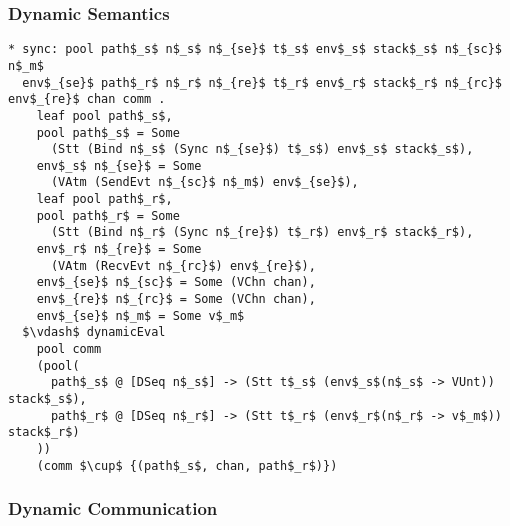 \documentclass{beamer}
\begin{document}
\begin{frame}[fragile]
	\frametitle{Dynamic Semantics}
\begin{lstlisting}[language=logic, mathescape]
* sync: pool path$_s$ n$_s$ n$_{se}$ t$_s$ env$_s$ stack$_s$ n$_{sc}$ n$_m$
  env$_{se}$ path$_r$ n$_r$ n$_{re}$ t$_r$ env$_r$ stack$_r$ n$_{rc}$ env$_{re}$ chan comm .
    leaf pool path$_s$,
    pool path$_s$ = Some
      (Stt (Bind n$_s$ (Sync n$_{se}$) t$_s$) env$_s$ stack$_s$),
    env$_s$ n$_{se}$ = Some
      (VAtm (SendEvt n$_{sc}$ n$_m$) env$_{se}$),
    leaf pool path$_r$,
    pool path$_r$ = Some
      (Stt (Bind n$_r$ (Sync n$_{re}$) t$_r$) env$_r$ stack$_r$),
    env$_r$ n$_{re}$ = Some
      (VAtm (RecvEvt n$_{rc}$) env$_{re}$),
    env$_{se}$ n$_{sc}$ = Some (VChn chan),
    env$_{re}$ n$_{rc}$ = Some (VChn chan), 
    env$_{se}$ n$_m$ = Some v$_m$
  $\vdash$ dynamicEval
    pool comm
    (pool(
      path$_s$ @ [DSeq n$_s$] -> (Stt t$_s$ (env$_s$(n$_s$ -> VUnt)) stack$_s$), 
      path$_r$ @ [DSeq n$_r$] -> (Stt t$_r$ (env$_r$(n$_r$ -> v$_m$)) stack$_r$)
    )) 
    (comm $\cup$ {(path$_s$, chan, path$_r$)})
\end{lstlisting}
\end{frame}

\begin{frame}[fragile]
	\frametitle{Dynamic Communication}
\begin{lstlisting}[language=logic, mathescape]
\end{lstlisting}
\end{frame}
\end{document}
